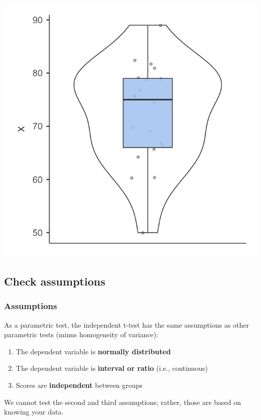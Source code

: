 \documentclass[
]{book}
\begin{document}
\includegraphics[width=5.44792in,height=\textheight]{images/07.1-one_sample_t-test/plot.png}

\hypertarget{check-assumptions}{%
\subsection{Check assumptions}\label{check-assumptions}}

\hypertarget{assumptions}{%
\subsubsection{Assumptions}\label{assumptions}}

As a parametric test, the independent t-test has the same assumptions as other parametric tests (minus homogeneity of variance):

\begin{enumerate}
\def\labelenumi{\arabic{enumi}.}
\item
  The dependent variable is \textbf{normally distributed}
\item
  The dependent variable is \textbf{interval or ratio} (i.e., continuous)
\item
  Scores are \textbf{independent} between groups
\end{enumerate}

We cannot test the second and third assumptions; rather, those are based on knowing your data.
\end{document}
